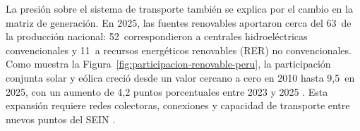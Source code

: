 La presión sobre el sistema de transporte también se explica por el cambio en la matriz de generación. En 2025, las fuentes renovables aportaron cerca del 63\,\pct{} de la producción nacional: 52\,\pct{} correspondieron a centrales hidroeléctricas convencionales y 11\,\pct{} a recursos energéticos renovables (RER) no convencionales. Como muestra la Figura~\ref{fig:participacion-renovable-peru}, la participación conjunta solar y eólica creció desde un valor cercano a cero en 2010 hasta 9,5\,\pct{} en 2025, con un aumento de 4,2 puntos porcentuales entre 2023 y 2025 \parencites[sec.~10.4]{minem2025anuario2024}[cuadro~4]{minem2025indicadoresDiciembre}. Esta expansión requiere redes colectoras, conexiones y capacidad de transporte entre nuevos puntos del SEIN \parencites{coes2023diagnostico2025_2034}{iea2025transmissiongrid}.

